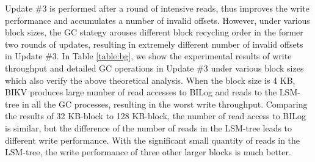 \documentclass[sigconf]{acmart}
\begin{document}
Update \#3 is performed after a round of intensive reads, thus improves the write performance and accumulates a number of invalid offsets. However, under various block sizes, the GC stategy arouses different block recycling order in the former two rounds of updates, resulting in extremely different number of invalid offsets in Update \#3. In Table \ref{table:bg}, we show the experimental results of write throughput and detailed GC operations in Update \#3 under various block sizes which also verify the above theoretical analysis. When the block size is 4 KB, BIKV produces large number of read accesses to BILog and reads to the LSM-tree in all the GC processes, resulting in the worst write throughput. Comparing the results of 32 KB-block to 128 KB-block, the number of read access to BILog is similar, but the difference of the number of reads in the LSM-tree leads to different write performance. With the significant small quantity of reads in the LSM-tree, the write performance of three other larger blocks is much better.
\begin{table}[t]
	\setlength{\abovecaptionskip}{0.cm}	
	\setlength{\belowcaptionskip}{-0.cm}
	\centering		
	\makeatletter{}\makeatother\caption{The detailed GC operations in Update \#3 under various block sizes. }
	\label{table:bg}
	\renewcommand\tabcolsep{4pt}
	\renewcommand\arraystretch{1.1}
\end{table} 
\end{document}
